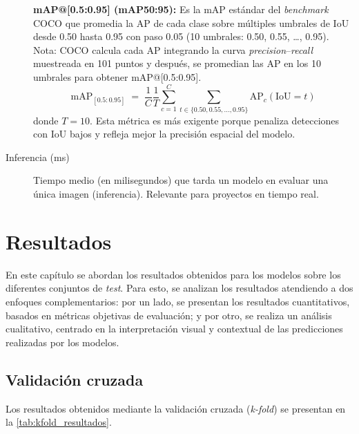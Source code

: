 \documentclass[12pt,a4paper,onecolumn,oneside]{report}
\begin{document}
\begin{description}
  \medskip

  \noindent\textbf{mAP@[0.5:0.95] (mAP50:95):} Es la mAP estándar del \textit{benchmark} COCO que promedia la AP de cada clase sobre múltiples umbrales de IoU desde 0.50 hasta 0.95 con paso 0.05 (10 umbrales: 0.50, 0.55, …, 0.95). Nota: COCO calcula cada AP integrando la curva \textit{precision}–\textit{recall} muestreada en 101 puntos y después, se promedian las AP en los 10 umbrales para obtener mAP@[0.5:0.95].
  \[
    \mathrm{mAP}_{[0.5:0.95]} \;=\; \frac{1}{C}\frac{1}{T}\sum_{c=1}^{C}\sum_{t\in\{0.50,0.55,\dots,0.95\}} \mathrm{AP}_c(\mathrm{IoU}=t)
  \]
  donde $T=10$. Esta métrica es más exigente porque penaliza detecciones con IoU bajos y refleja mejor la precisión espacial del modelo.

  \item[Inferencia (ms)] Tiempo medio (en milisegundos) que tarda un modelo en evaluar una única imagen (inferencia). Relevante para proyectos en tiempo real.

\end{description}


\chapter{Resultados} %
\label{Resultados}

En este capítulo se abordan los resultados obtenidos para los modelos sobre los diferentes conjuntos de \textit{test}. Para esto, se analizan 
los resultados atendiendo a dos enfoques complementarios: 
por un lado, se presentan los resultados cuantitativos, basados en métricas objetivas de evaluación; y por otro, se realiza un análisis cualitativo, 
centrado en la interpretación visual y contextual de las predicciones realizadas por los modelos.

\section{Validación cruzada}
\label{sec:Validación cruzada}

Los resultados obtenidos mediante la validación cruzada (\textit{k-fold}) se presentan en la \autoref{tab:kfold_resultados}.
\end{document}
